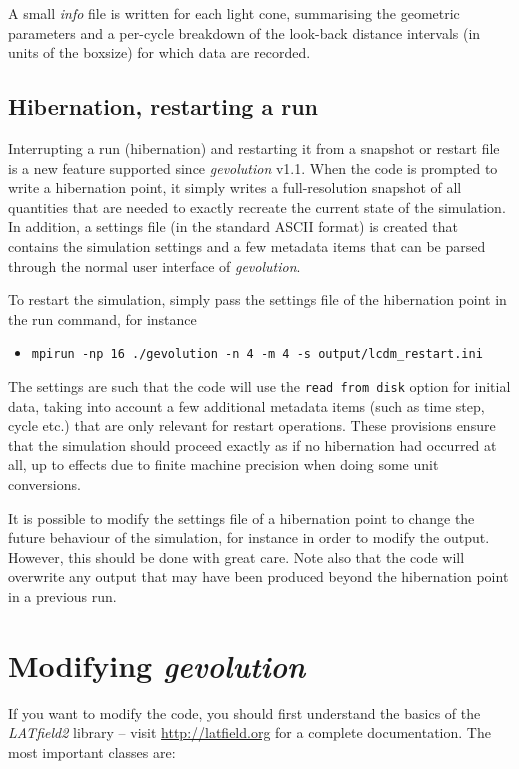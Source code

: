 \documentclass[a4paper,10pt]{article}
\begin{document}
A small \textit{info} file is written for each light cone, summarising the geometric parameters and a per-cycle breakdown of the look-back distance intervals
(in units of the boxsize) for which data are recorded.

\subsection{Hibernation, restarting a run}

Interrupting a run (hibernation) and restarting it from a snapshot or restart file is a new feature supported since
\textit{gevolution} v1.1. When the code is prompted to write a hibernation point, it simply writes a full-resolution snapshot
of all quantities that are needed to exactly recreate the current state of the simulation. In addition, a settings file (in the
standard ASCII format) is created that contains the simulation settings and a few metadata items that can be parsed through the
normal user interface of \textit{gevolution}.

To restart the simulation, simply pass the settings file of the hibernation point in the run command, for instance

\begin{itemize}
 \item[] \texttt{mpirun -np 16 ./gevolution -n 4 -m 4 -s output/lcdm\_restart.ini} 
\end{itemize}

The settings are such that the code will use the \texttt{read from disk} option for initial data, taking into account a few
additional metadata items (such as time step, cycle etc.) that are only relevant for restart operations. These provisions
ensure that the simulation should proceed exactly as if no hibernation had occurred at all, up to effects due to finite machine
precision when doing some unit conversions.

It is possible to modify the settings file of a hibernation point to change the future behaviour of the simulation, for instance in order
to modify the output. However, this should be done with great care. Note also that the code will overwrite any output that may have
been produced beyond the hibernation point in a previous run.

\section{Modifying \textit{gevolution}}

If you want to modify the code, you should first understand the basics of the \textit{LATfield2} library -- visit \url{http://latfield.org} for a complete documentation. The most important classes are:
\end{document}

